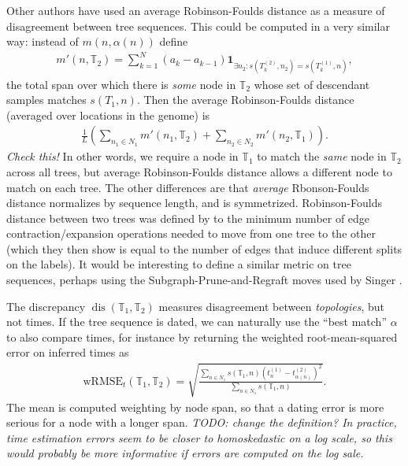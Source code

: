 \documentclass[10pt,twoside,lineno]{gsajnl}
\newcommand{\T}{\mathbb{T}}
\newcommand{\ind}{\mathbf{1}}
\newcommand{\dis}{\operatorname{dis}}
\newcommand{\comment}[1]{{\color{violet} \it #1}}
\begin{document}
Other authors \citep[e.g.,]{kelleher2019inferring} have used
an average Robinson-Foulds distance \citep{robinson1981comparison}
as a measure of disagreement between tree sequences.
This could be computed in a very similar way:
instead of $m(n, \alpha(n))$ define
\begin{align*}
    m'(n, \T_2) = \sum_{k=1}^N (a_k - a_{k-1}) \ind_{\exists n_2: s(T^{(2)}_k, n_2) = s(T^{(1)}_k, n)} ,
\end{align*}
the total span over which there is \emph{some} node in $\T_2$ whose set of descendant samples
matches $s(T_1,n)$.
Then the average Robinson-Foulds distance (averaged over locations in the genome)
is
\begin{align*}
    \frac{1}{L} \left( \sum_{n_1 \in N_1} m'(n_1, \T_2)  + \sum_{n_2 \in N_2} m'(n_2, \T_1) \right).
\end{align*}
\comment{Check this!}
In other words, we require a node in $\T_1$ to match the \emph{same} node in $\T_2$
across all trees, but average Robinson-Foulds distance allows a different node to match
on each tree.
The other differences are that \emph{average} Rbonson-Foulds distance
normalizes by sequence length, and is symmetrized.
Robinson-Foulds distance between two trees
was defined by \citet{robinson1981comparison}
to the minimum number of edge contraction/expansion operations needed to move
from one tree to the other
(which they then show is equal to the number of edges that induce different splits on the labels).
It would be interesting to define a similar metric on tree sequences,
perhaps using the Subgraph-Prune-and-Regraft moves used by Singer \citet{deng2024robust}.

The discrepancy $\dis(\T_1, \T_2)$ measures disagreement between \emph{topologies},
but not times.
If the tree sequence is dated, we can naturally use the ``best match'' $\alpha$
to also compare times,
for instance by returning the weighted root-mean-squared error on inferred times as
\begin{align*}
    \text{wRMSE}_t(\T_1, \T_2)
    = \sqrt{\frac{
        \sum_{n \in N_1} s(\T_1,n) \left(t^{(1)}_n - t^{(2)}_{\alpha(n)} \right)^2 
    }{
        \sum_{n \in N_1} s(\T_1,n)
    } } .
\end{align*}
The mean is computed weighting by node span, so that a dating error
is more serious for a node with a longer span.
\comment{TODO: change the definition?
In practice, time estimation errors seem to be closer to homoskedastic on a log scale,
so this would probably be more informative if errors are computed on the log sale.}
\end{document}
